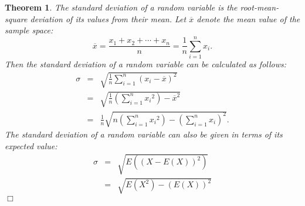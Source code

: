 \documentclass[11pt, letterpaper]{article}
\newenvironment{theorem}
{\noindent\begin{thm}}
{\hfill $\Box$ \end{thm}}
\newtheorem{thm}{Theorem}
\begin{document}
\begin{theorem}
The standard deviation of a random variable is the root-mean-square deviation of its values from their mean.  Let $\overline{x}$ denote the mean value of the sample space:
\[
	\overline{x} = \frac{x_1+x_2+\cdots+x_n}{n} = \frac{1}{n} \sum_{i=1}^n x_i.
\]
Then the standard deviation of a random variable can be calculated as follows:
\begin{eqnarray*}
	\sigma & = & \sqrt {\frac{1}{n} \sum_{i=1}^n (x_i - \overline{x})^2} \\
	& = & \sqrt {\frac{1}{n} \left( \sum_{i=1}^n {x_i}^2 \right) - \overline{x}^2 } \\
	& = & \frac{1}{n} \sqrt {n \left( \sum_{i=1}^n {x_i}^2 \right) - \left( \sum_{i=1}^n x_i \right)^2 }.
\end{eqnarray*}
The standard deviation of a random variable can also be given in terms of its expected value:
\begin{eqnarray*}
	\sigma & = & \sqrt {E((X-E(X))^2)} \\
	& = & \sqrt { E(X^2) - (E(X))^2 }
\end{eqnarray*}
\end{theorem}
\end{document}
